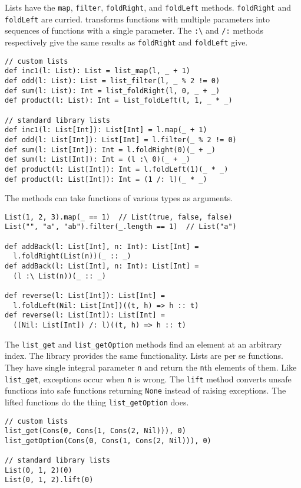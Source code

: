 Lists have the \verb!map!, \verb!filter!, \verb!foldRight!, and \verb!foldLeft!
methods. \verb!foldRight! and \verb!foldLeft! are curried. 
transforms functions with multiple parameters into sequences of functions with a
single parameter. The \verb!:\! and \verb!/:! methods respectively give the same
results as \verb!foldRight! and \verb!foldLeft! give.

\begin{verbatim}
// custom lists
def inc1(l: List): List = list_map(l, _ + 1)
def odd(l: List): List = list_filter(l, _ % 2 != 0)
def sum(l: List): Int = list_foldRight(l, 0, _ + _)
def product(l: List): Int = list_foldLeft(l, 1, _ * _)

// standard library lists
def inc1(l: List[Int]): List[Int] = l.map(_ + 1)
def odd(l: List[Int]): List[Int] = l.filter(_ % 2 != 0)
def sum(l: List[Int]): Int = l.foldRight(0)(_ + _)
def sum(l: List[Int]): Int = (l :\ 0)(_ + _)
def product(l: List[Int]): Int = l.foldLeft(1)(_ * _)
def product(l: List[Int]): Int = (1 /: l)(_ * _)
\end{verbatim}

The methods can take functions of various types as arguments.

\begin{verbatim}
List(1, 2, 3).map(_ == 1)  // List(true, false, false)
List("", "a", "ab").filter(_.length == 1)  // List("a")

def addBack(l: List[Int], n: Int): List[Int] =
  l.foldRight(List(n))(_ :: _)
def addBack(l: List[Int], n: Int): List[Int] =
  (l :\ List(n))(_ :: _)

def reverse(l: List[Int]): List[Int] =
  l.foldLeft(Nil: List[Int])((t, h) => h :: t)
def reverse(l: List[Int]): List[Int] =
  ((Nil: List[Int]) /: l)((t, h) => h :: t)
\end{verbatim}

The \verb!list_get! and \verb!list_getOption! methods find an element at an
arbitrary index. The library provides the same functionality. Lists are per se
functions. They have single integral parameter \verb!n! and return the \verb!n!th
elements of them. Like \verb!list_get!, exceptions occur when \verb!n! is wrong.
The \verb!lift! method converts unsafe functions into safe functions returning
\verb!None! instead of raising exceptions. The lifted functions do the thing
\verb!list_getOption! does.

\begin{verbatim}
// custom lists
list_get(Cons(0, Cons(1, Cons(2, Nil))), 0)
list_getOption(Cons(0, Cons(1, Cons(2, Nil))), 0)

// standard library lists
List(0, 1, 2)(0)
List(0, 1, 2).lift(0)
\end{verbatim}

